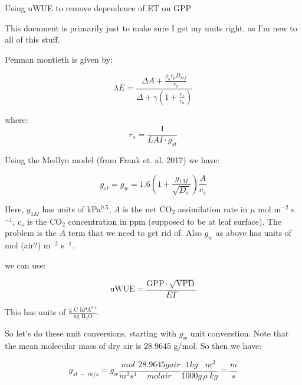 
\usepackage{graphics, graphicx}
\graphicspath{ {./} } %


\begin{center}
\large{Using uWUE to remove dependence of ET on GPP}\end{center}

\bigskip

This document is primarily just to make sure I get my units right, as I'm new to all of this stuff.

Penman montieth is given by:

\begin{equation}
  \lambda E = \frac{\Delta A + \frac{\rho_a c_p D_{ref}}{r_a}}{\Delta + \gamma(1 + \frac{r_s}{r_a})}
\end{equation}

where:
\begin{equation}
  r_s = \frac{1}{LAI \cdot  g_{st}}
\end{equation}

Using the Medlyn model (from Frank et. al. 2017) we have:

\begin{equation}
g_{st} = g_{w} = 1.6 \left( 1 + \frac{g_{1M}}{\sqrt{D_s}} \right) \frac{A}{c_s}
\end{equation}

Here, $g_{1M}$ has units of kPa$^{0.5}$, $A$ is the net CO$_2$ assimilation rate in $\mu$ mol m$^{-2}$ s$^{-1}$, $c_s$ is the CO$_2$ concentration in ppm (supposed to be at leaf surface). The problem is the $A$ term that we need to get rid of. Also $g_w$ as above has units of mol (air?) m$^{-2}$ s$^{-1}$. 

we can use:

\begin{equation}
  \text{uWUE} = \frac{\text{GPP} \cdot \sqrt{\text{VPD}}}{ET}
\end{equation}

This has units of $\frac{\text{g C  hPA}^{0.5}}{\text{kg H$_2$O}}$.

So let's do these unit conversions, starting with $g_w$ unit converstion. Note that the mean molecular mass of dry air is $28.9645$ g/mol. So then we have:


\begin{equation}
  g_{st\; -\; m/s} = g_w \frac{mol}{m^2 s^1} \frac{28.9645 g air}{ mol air} \frac{1 kg}{1000 g} \frac{m^3}{\rho \; kg} = \frac{m}{s}
\end{equation}

